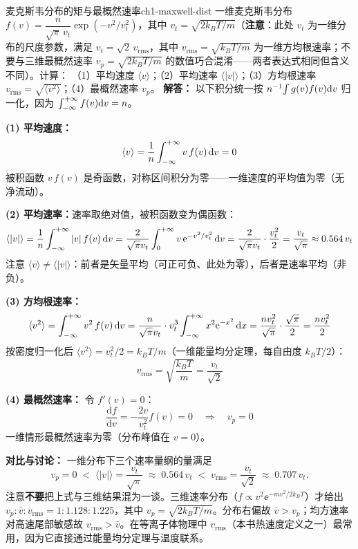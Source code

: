 \begin{example}{麦克斯韦分布的矩与最概然速率}{ch1-maxwell-dist}
一维麦克斯韦分布 $f(v) = \dfrac{n}{\sqrt{\pi}\,v_t}\exp(-v^2/v_t^2)$，其中 $v_t = \sqrt{2k_{\!B}T/m}$（\textbf{注意}：此处 $v_t$ 为一维分布的尺度参数，满足 $v_t = \sqrt{2}\,v_{\mathrm{rms}}$，其中 $v_{\mathrm{rms}}=\sqrt{k_{\!B}T/m}$ 为一维方均根速率；不要与三维最概然速率 $v_p=\sqrt{2k_{\!B}T/m}$ 的数值巧合混淆——两者表达式相同但含义不同）。计算：
（1）平均速度 $\langle v\rangle$；（2）平均速率 $\langle|v|\rangle$；（3）方均根速率 $v_{\mathrm{rms}}=\sqrt{\langle v^2\rangle}$；（4）最概然速率 $v_p$。
\tcblower
\textbf{解答：}
以下积分统一按 $n^{-1}\!\int g(v)f(v)\mathrm{d} v$ 归一化，因为 $\int_{-\infty}^{+\infty} f(v)\mathrm{d} v = n$。

\textbf{(1) 平均速度：}
\[
\langle v\rangle = \frac{1}{n}\int_{-\infty}^{+\infty} v\,f(v)\,\mathrm{d} v = 0
\]
被积函数 $v\,f(v)$ 是奇函数，对称区间积分为零——一维速度的平均值为零（无净流动）。

\textbf{(2) 平均速率：}速率取绝对值，被积函数变为偶函数：
\[
\langle|v|\rangle = \frac{1}{n}\int_{-\infty}^{+\infty} |v|\,f(v)\,\mathrm{d} v
= \frac{2}{\sqrt{\pi}v_t}\int_{0}^{+\infty} v\,\mathrm{e}^{-v^2/v_t^2}\,\mathrm{d} v
= \frac{2}{\sqrt{\pi}v_t}\cdot\frac{v_t^2}{2}
= \frac{v_t}{\sqrt{\pi}} \approx 0.564\,v_t
\]
注意 $\langle v\rangle \ne \langle|v|\rangle$：前者是矢量平均（可正可负、此处为零），后者是速率平均（非负）。

\textbf{(3) 方均根速率：}
\[
\langle v^2\rangle = \int_{-\infty}^{+\infty} v^2\,f(v)\,\mathrm{d} v = \frac{n}{\sqrt{\pi}v_t}\cdot v_t^3\int_{-\infty}^{+\infty} x^2\mathrm{e}^{-x^2}\,\mathrm{d} x = \frac{n v_t^2}{\sqrt{\pi}}\cdot\frac{\sqrt{\pi}}{2} = \frac{n v_t^2}{2}
\]
按密度归一化后 $\langle v^2\rangle = v_t^2/2 = k_{\!B}T/m$（一维能量均分定理，每自由度 $k_{\!B}T/2$）：
\[
v_{\mathrm{rms}} = \sqrt{\frac{k_{\!B}T}{m}} = \frac{v_t}{\sqrt{2}}
\]

\textbf{(4) 最概然速率：} 令 $f'(v)=0$：
\[
\frac{\mathrm{d}f}{\mathrm{d}v} = -\frac{2v}{v_t^2}f(v) = 0 \quad\Rightarrow\quad v_p = 0
\]
一维情形最概然速率为零（分布峰值在 $v=0$）。

\textbf{对比与讨论：} 一维分布下三个速率量纲的量满足
\[
v_p = 0 \;<\; \langle|v|\rangle = \frac{v_t}{\sqrt{\pi}} \;\approx\; 0.564\,v_t \;<\; v_{\mathrm{rms}} = \frac{v_t}{\sqrt{2}} \;\approx\; 0.707\,v_t .
\]
注意\textbf{不要}把上式与三维结果混为一谈。三维速率分布（$f\propto v^2\ee^{-mv^2/2k_BT}$）才给出 $v_p : \bar v : v_{\mathrm{rms}} = 1 : 1.128 : 1.225$，其中 $v_p=\sqrt{2k_BT/m}$。分布右偏故 $\bar v > v_p$；均方速率对高速尾部敏感故 $v_{\mathrm{rms}} > \bar v$。在等离子体物理中 $v_{\mathrm{rms}}$（本书热速度定义之一）最常用，因为它直接通过能量均分定理与温度联系。
\end{example}

